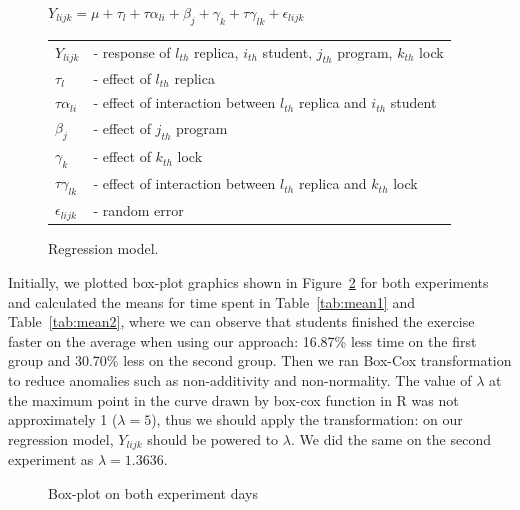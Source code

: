 \begin{figure}
\begin{center}
$Y_{lijk} = \mu + \tau_{l} + \tau\alpha_{li} + \beta_{j} + \gamma_{k} + \tau\gamma_{lk} + \epsilon_{lijk}$\\
\vspace{4mm}
\begin{tabular}{ll}
$Y_{lijk}$ & - response of $l_{th}$ replica, $i_{th}$ student, $j_{th}$ program, $k_{th}$ lock \\
$\tau_{l}$ & - effect of $l_{th}$ replica \\
$\tau\alpha_{li}$ & - effect of interaction between $l_{th}$ replica and $i_{th}$ student \\
$\beta_{j}$ & - effect of $j_{th}$ program \\
$\gamma_{k}$ & - effect of $k_{th}$ lock \\
$\tau\gamma_{lk}$ & - effect of interaction between $l_{th}$ replica and $k_{th}$ lock \\
$\epsilon_{lijk}$ & - random error \\
\end{tabular}
\caption{Regression model.}\label{fig:model}
\end{center}
\end{figure}

Initially, we plotted box-plot graphics shown in Figure~\ref{fig:boxplot} for both experiments and calculated the means for time spent in Table~\ref{tab:mean1} and Table~\ref{tab:mean2}, where we can observe that students finished the exercise faster on the average when using our approach: 16.87\% less time on the first group and 30.70\% less on the second group. Then we ran Box-Cox transformation to reduce anomalies such as non-additivity and non-normality. The value of $\lambda$ at the maximum point in the curve drawn by box-cox function in R was not approximately 1 ($\lambda = 5$), thus we should apply the transformation: on our regression model, $Y_{lijk}$ should be powered to $\lambda$. We did the same on the second experiment as $\lambda = 1.3636$.

\begin{figure}%
    \centering
    \qquad
    \caption{Box-plot on both experiment days}\label{fig:boxplots}%
    \label{fig:boxplot}%
\end{figure}


